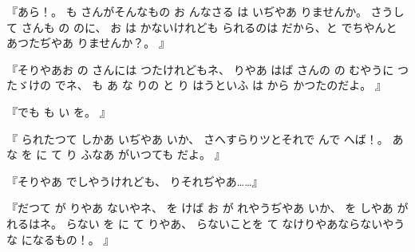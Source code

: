 『あら！。
も
さんがそんなもの
お
んなさる
は
いぢやあ
りませんか。
さうして
さんも
の
のに、
お
は
かないけれども
られるのは
だから、と
でちやんと
あつたぢやあ
りませんか？。
』

『そりやあお
の
さんには
つたけれどもネ、
りやあ
はば
さんの
の
むやうに
つたゞけの
でネ、
も
あ
な
りの
と
り
はうといふ
は
から
かつたのだよ。
』

『でも
も
い
を。
』

『
られたつて
しかあ
いぢやあ
いか、
さへすらりツとそれで
んで
へば！。
あ
な
を
に
て
り
ふなあ
がいつても
だよ。
』

『そりやあ
でしやうけれども、
りそれぢやあ……』

『だつて
が
りやあ
ないやネ、
を
けば
お
が
れやうぢやあ
いか、
を
しやあ
が
れるはネ。
らない
を
に
て
りやあ、
らないことを
て
なけりやあならないやうな
になるもの！。
』

